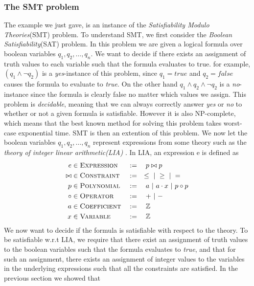	\subsubsection{The SMT problem}

	The example we just gave, is an instance of the \emph{Satisfiability Modulo Theories}(SMT) problem. To understand SMT, we first consider the \emph{Boolean Satisfiability}(SAT) problem. In this problem we are given a logical formula over boolean variables $q_1, q_2, \ldots, q_n$. We want to decide if there exists an assignment of truth values to each variable such that the formula evaluates to true. for example, $(q_1 \land \neg q_2)$ is a \emph{yes}-instance of this problem, since $q_1 = true$ and $q_2 = false$ causes the formula to evaluate to \emph{true}. On the other hand $q_1 \land q_2 \land \neg q_2$ is a \emph{no}-instance since the formula is clearly false no matter which values we assign. This problem is \emph{decidable}, meaning that we can always correctly answer \emph{yes} or \emph{no} to whether or not a given formula is satisfiable. However it is also NP-complete, which means that the best known method for solving this problem takes worst-case exponential time. SMT is then an extention of this problem. We now let the boolean variables $q_1, q_2, \ldots, q_n$ represent expressions from some theory such as the \emph{theory of integer linear arithmetic(LIA)} \cite{DeMoura2011}. In LIA, an expression e is defined as 
		\begin{alignat*}{3}
			e & \in \textsc{Expression} && := \quad p \bowtie p\\
			\bowtie & \in \textsc{Constraint} && := \quad \leq \ | \  \geq \ | \  =\\
			p & \in \textsc{Polynomial} && := \quad a \ | \  a\cdot x \ | \  p \circ p\\
			\circ & \in \textsc{Operator} && := \quad + \ | \  - \\
			a & \in \textsc{Coefficient} && := \quad \mathbb{Z}\\
			x & \in \textsc{Variable} && := \quad \mathbb{Z}			
		\end{alignat*} 
	We now want to decide if the formula is satisfiable with respect to the theory. To be satisfiable w.r.t LIA, we require that there exist an assignment of truth values to the boolean variables such that the formula evaluates to \emph{true}, and that for such an assignment, there exists an assignment of integer values to the variables in the underlying expressions such that all the constraints are satisfied. In the previous section we showed that 
	
